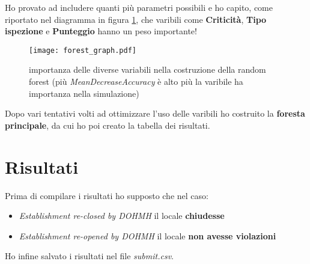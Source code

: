 \documentclass[10pt]{article}
\begin{document}
Ho provato ad includere quanti più parametri possibili e ho capito, come riportato nel  diagramma in figura \ref{fig:random}, che varibili come \textbf{Criticità}, \textbf{Tipo ispezione} e \textbf{Punteggio} hanno un peso importante!
\begin{figure}[p!]
\centering
\texttt{[image: forest\_graph.pdf]}
\caption{importanza delle diverse variabili nella costruzione della random forest (più \emph{MeanDecreaseAccuracy} è alto più la varibile ha importanza nella simulazione)}
\label{fig:random}
\end{figure}
Dopo vari tentativi volti ad ottimizzare l'uso delle varibili ho costruito la \textbf{foresta principale}, da cui ho poi creato la tabella dei risultati.

\section{Risultati}
\label{sec:risultati}
Prima di compilare i risultati ho supposto che nel caso:
\begin{itemize}
\item \emph{Establishment re-closed by DOHMH} il locale \textbf{chiudesse}
\item \emph{Establishment re-opened by DOHMH} il locale \textbf{non avesse violazioni}
\end{itemize} 

Ho infine salvato i risultati nel file \emph{submit.csv}.
\end{document}
